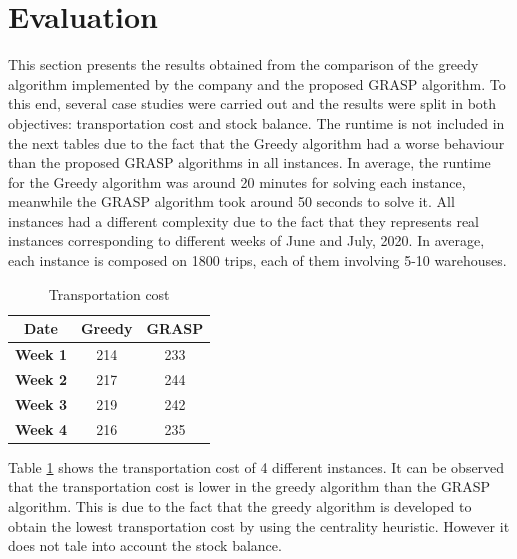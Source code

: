 \documentclass[letterpaper]{article} %
\begin{document}
\section*{Evaluation}

This section presents the results obtained from the comparison of the greedy algorithm implemented by the company and the proposed GRASP algorithm. To this end, several case studies were carried out and the results were split in both objectives: transportation cost and stock balance. The runtime is not included in the next tables due to the fact that the Greedy algorithm had a worse behaviour than the proposed GRASP algorithms in all instances. In average, the runtime for the Greedy algorithm was around 20 minutes for solving each instance, meanwhile the GRASP algorithm took around 50 seconds to solve it. All instances had a different complexity due to the fact that they represents real instances corresponding to different weeks of June and July, 2020. In average, each instance is composed on 1800 trips, each of them involving 5-10 warehouses.

\begin{table}[H]
    \centering
    \begin{tabular}{|c|c|c|}
    \hline
    \textbf{Date}   & \textbf{Greedy} & \textbf{GRASP} \\ \hline
    \textbf{Week 1} & 214             & 233            \\ \hline
    \textbf{Week 2} & 217             & 244            \\ \hline
    \textbf{Week 3} & 219             & 242            \\ \hline
    \textbf{Week 4} & 216             & 235            \\ \hline
    \end{tabular}
    \caption{Transportation cost}
    \label{tab:georesultados}
\end{table}

 Table \ref{tab:georesultados} shows the transportation cost of 4 different instances. It can be observed that the transportation cost is lower in the greedy algorithm than the GRASP algorithm. This is due to the fact that the greedy algorithm is developed to obtain the lowest transportation cost by using the centrality heuristic. However it does not tale into account the stock balance.
\end{document}
